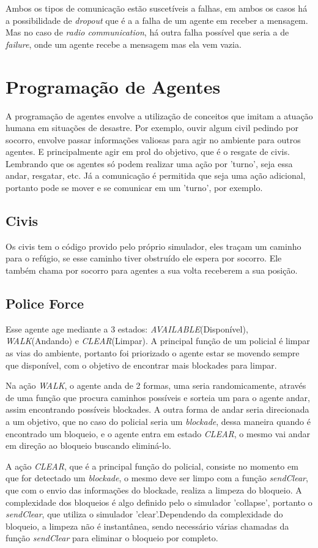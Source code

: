 \documentclass[conference]{IEEEtran}
\begin{document}
Ambos os tipos de comunicação estão suscetíveis a falhas, em ambos os casos há a possibilidade de \textit{dropout} que é a a falha de um agente em receber a mensagem. Mas no caso de \textit{radio communication}, há outra falha possível que seria a de \textit{failure}, onde um agente recebe a mensagem mas ela vem vazia.

\section{Programação de Agentes}
A programação de agentes envolve a utilização de conceitos que imitam a atuação humana em situações de desastre. Por exemplo, ouvir algum civil pedindo por socorro, envolve passar informações valiosas para agir no ambiente para outros agentes. E principalmente agir em prol do objetivo, que é o resgate de civis.
Lembrando que os agentes só podem realizar uma ação por 'turno', seja essa andar, resgatar, etc. Já a comunicação é permitida que seja uma ação adicional, portanto pode se mover e se comunicar em um 'turno', por exemplo.
\subsection{Civis}
Os civis tem o código provido pelo próprio simulador, eles traçam um caminho para o refúgio, se esse caminho tiver obstruído ele espera por socorro. Ele também chama por socorro para agentes a sua volta receberem a sua posição.
\subsection{Police Force}
Esse agente age mediante a 3 estados: \textit{AVAILABLE}(Disponível), \textit{WALK}(Andando) e \textit{CLEAR}(Limpar). A principal função de um policial é limpar as vias do ambiente, portanto foi priorizado o agente estar se movendo sempre que disponível, com o objetivo de encontrar mais blockades para limpar.

Na ação \textit{WALK}, o agente anda de 2 formas, uma seria randomicamente, através de uma função que procura caminhos possíveis e sorteia um para o agente andar, assim encontrando possíveis blockades. A outra forma de andar seria direcionada a um objetivo, que no caso do policial seria um \textit{blockade}, dessa maneira quando é encontrado um bloqueio, e o agente entra em estado \textit{CLEAR}, o mesmo vai andar em direção ao bloqueio buscando eliminá-lo.

A ação \textit{CLEAR}, que é a principal função do policial, consiste no momento em que for detectado um \textit{blockade}, o mesmo deve ser limpo com a função \textit{sendClear}, que com o envio das informações do blockade, realiza a limpeza do bloqueio. A complexidade dos bloqueios é algo definido pelo o simulador 'collapse', portanto o \textit{sendClear}, que utiliza o simulador 'clear'.Dependendo da complexidade do bloqueio, a limpeza não é instantânea, sendo necessário várias chamadas da função \textit{sendClear} para eliminar o bloqueio por completo.
\end{document}
